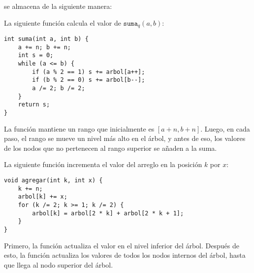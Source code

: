 se almacena de la siguiente manera:
\begin{center}
\end{center}

\newpage
La siguiente función
calcula el valor de $\texttt{suma}_q(a,b)$:
\begin{lstlisting}
int suma(int a, int b) {
    a += n; b += n;
    int s = 0;
    while (a <= b) {
        if (a % 2 == 1) s += arbol[a++];
        if (b % 2 == 0) s += arbol[b--];
        a /= 2; b /= 2;
    }
    return s;
}
\end{lstlisting}
La función mantiene un rango
que inicialmente es $[a+n,b+n]$.
Luego, en cada paso, el rango se mueve
un nivel más alto en el árbol,
y antes de eso, los valores de los nodos que no
pertenecen al rango superior se añaden a la suma.

La siguiente función incrementa el valor del arreglo
en la posición $k$ por $x$:
\begin{lstlisting}
void agregar(int k, int x) {
    k += n;
    arbol[k] += x;
    for (k /= 2; k >= 1; k /= 2) {
        arbol[k] = arbol[2 * k] + arbol[2 * k + 1];
    }
}
\end{lstlisting}
Primero, la función actualiza el valor
en el nivel inferior del árbol.
Después de esto, la función actualiza los valores de todos
los nodos internos del árbol, hasta que llega
al nodo superior del árbol.

